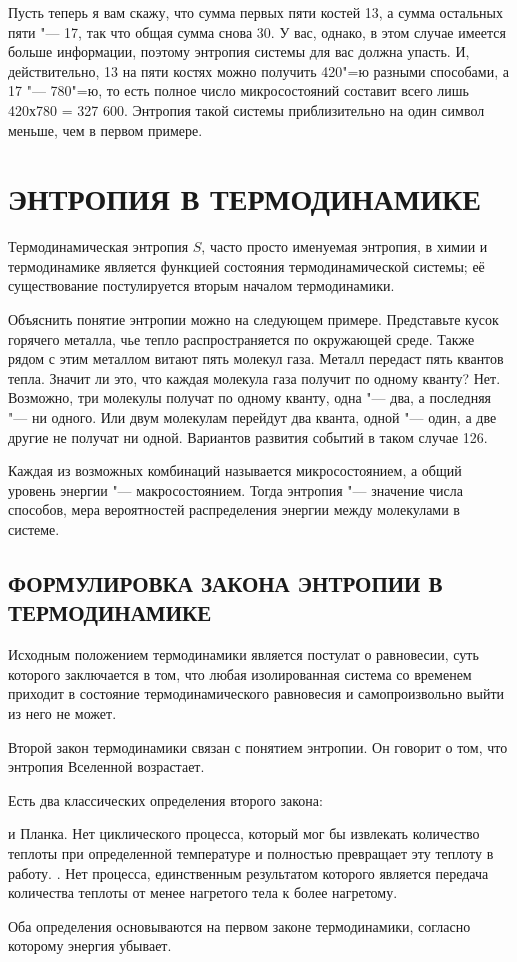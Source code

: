 \documentclass[referat, times]{SCWorks}
\begin{document}
Пусть теперь я вам скажу, что сумма первых пяти костей 13, а сумма остальных пяти "--- 17, так что общая сумма снова 30. У вас, однако, в этом случае имеется больше информации, поэтому энтропия системы для вас должна упасть. И, действительно, 13 на пяти костях можно получить 420"=ю разными способами, а 17 "--- 780"=ю, то есть полное число микросостояний составит всего лишь 420х780 = 327 600. Энтропия такой системы приблизительно на один символ меньше, чем в первом примере\cite{primer}.

\section{ЭНТРОПИЯ В ТЕРМОДИНАМИКЕ}

Термодинамическая энтропия $S$, часто просто именуемая энтропия, в химии и термодинамике является функцией состояния термодинамической системы; её существование постулируется вторым началом термодинамики\cite{termodopr}.

Объяснить понятие энтропии можно на следующем примере. Представьте кусок горячего металла, чье тепло распространяется по окружающей среде. Также рядом с этим металлом витают пять молекул газа. Металл передаст пять квантов тепла. Значит ли это, что каждая молекула газа получит по одному кванту? Нет. Возможно, три молекулы получат по одному кванту, одна "--- два, а последняя "--- ни одного. Или двум молекулам перейдут два кванта, одной "--- один, а две другие не получат ни одной. Вариантов развития событий в таком случае 126.

Каждая из возможных комбинаций называется микросостоянием, а общий уровень энергии "--- макросостоянием. Тогда энтропия "--- значение числа способов, мера вероятностей распределения энергии между молекулами в системе.

\subsection{ФОРМУЛИРОВКА ЗАКОНА ЭНТРОПИИ В ТЕРМОДИНАМИКЕ}

Исходным положением термодинамики является постулат о равновесии, суть которого заключается в том, что любая изолированная система со временем приходит в состояние термодинамического равновесия и самопроизвольно выйти из него не может.

Второй закон термодинамики связан с понятием энтропии. Он говорит о том, что энтропия Вселенной возрастает.

Есть два классических определения второго закона:
\begin{itemize}
 и Планка. Нет циклического процесса, который мог бы извлекать количество теплоты при определенной температуре и полностью превращает эту теплоту в работу.
. Нет процесса, единственным результатом которого является передача количества теплоты от менее нагретого тела к более нагретому.
\end{itemize}
Оба определения основываются на первом законе термодинамики, согласно которому энергия убывает.
\end{document}

